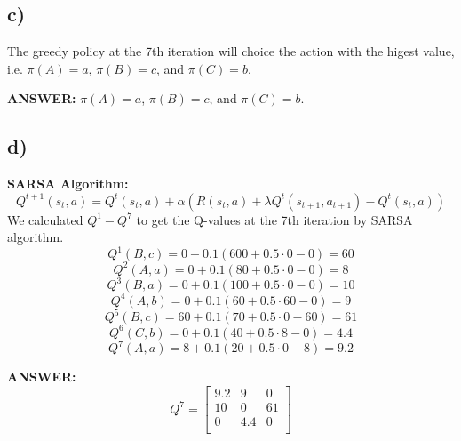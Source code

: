 \documentclass{article}
\begin{document}
\subsection*{c)}
The greedy policy at the 7th iteration will choice the action with the higest value, i.e. $\pi(A)=a$, $\pi(B)=c$, and $\pi(C)=b$.

\textbf{ANSWER:} $\pi(A)=a$, $\pi(B)=c$, and $\pi(C)=b$.

\subsection*{d)}
\textbf{SARSA Algorithm:} \begin{equation}
 Q^{t+1}(s_t,a) = Q^t(s_t,a) + \alpha \left(R(s_t,a) + \lambda Q^t(s_{t+1}, a_{t+1}) - Q^t(s_t,a) \right)\end{equation}
We calculated $Q^1-Q^7$ to get the Q-values at the 7th iteration by SARSA algorithm. 
\begin{equation*}
     Q^{1}(B,c) = 0 + 0.1(600 + 0.5\cdot0 - 0 ) = 60
\end{equation*}
\begin{equation*}
     Q^{2}(A,a) = 0 + 0.1(80 + 0.5\cdot0 - 0 ) = 8
\end{equation*}
\begin{equation*}
     Q^{3}(B,a) = 0 + 0.1(100 + 0.5\cdot0 - 0 ) = 10
\end{equation*}
\begin{equation*}
     Q^{4}(A,b) = 0 + 0.1(60 + 0.5\cdot60 - 0 ) = 9
\end{equation*}
\begin{equation*}
     Q^{5}(B,c) = 60 + 0.1(70 + 0.5\cdot0 - 60 ) = 61
\end{equation*}
\begin{equation*}
     Q^{6}(C,b) = 0 + 0.1(40 + 0.5\cdot8 - 0 ) = 4.4
\end{equation*}
\begin{equation*}
     Q^{7}(A,a) = 8 + 0.1(20 + 0.5\cdot0 -8 ) = 9.2
\end{equation*}

\textbf{ANSWER:}
\begin{equation*}
    Q^7=
    \left[
    \begin{array}{ccc}
        9.2 & 9 & 0 \\
         10 & 0 & 61 \\
         0 & 4.4 & 0 \\
    \end{array}
    \right]
\end{equation*}
\end{document}

